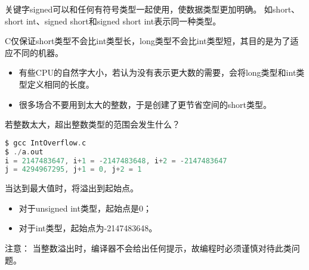 %
\begin{frame}[fragile]
关键字signed可以和任何有符号类型一起使用，使数据类型更加明确。
如short、short int、signed short和signed short int表示同一种类型。
\end{frame}
%
\begin{frame}[fragile]
C仅保证short类型不会比int类型长，long类型不会比int类型短，其目的是为了适应不同的机器。\vspace{0.05in}

\begin{itemize}
\item 有些CPU的自然字大小，若认为没有表示更大数的需要，会将long类型和int类型定义相同的长度。\\[0.1in]
\item 很多场合不要用到太大的整数，于是创建了更节省空间的short类型。
\end{itemize}
\end{frame}

\begin{frame}[fragile]
\begin{wenti}
若整数太大，超出整数类型的范围会发生什么？
\end{wenti}
\end{frame}

\begin{frame}[fragile]

\end{frame}
%
\begin{frame}[fragile]

\begin{lstlisting}[language=c,backgroundcolor=\color{red!10}]
$ gcc IntOverflow.c
$ ./a.out
i = 2147483647, i+1 = -2147483648, i+2 = -2147483647
j = 4294967295, j+1 = 0, j+2 = 1
\end{lstlisting}
\end{frame}
%
\begin{frame}[fragile]

当达到最大值时，将溢出到起始点。\vspace{0.05in}
\begin{itemize}
\item 对于unsigned int类型，起始点是0；\\[0.1in]
\item 对于int类型，起始点为-2147483648。
\end{itemize}

\vspace{0.1in}
 注意： 当整数溢出时，编译器不会给出任何提示，故编程时必须谨慎对待此类问题。 

\end{frame}
